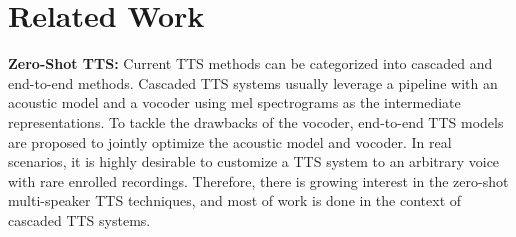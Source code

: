 \documentclass{article}
\theoremstyle{plain}
\theoremstyle{definition}
\theoremstyle{remark}
\newcommand\our{\textsc{VALL-E}}
\begin{document}

\section{Related Work}
\textbf{Zero-Shot TTS:} Current TTS methods can be categorized into cascaded  and end-to-end methods. Cascaded TTS systems \citep{DBLP:conf/icassp/ShenPWSJYCZWRSA18, DBLP:conf/nips/RenRTQZZL19,DBLP:conf/aaai/Li0LZL19} usually leverage a pipeline with an acoustic model and a vocoder using mel spectrograms as the intermediate representations. To tackle the drawbacks of the vocoder, end-to-end TTS models \citep{DBLP:conf/icml/KimKS21, DBLP:conf/interspeech/LiuXH0Z22} are proposed to jointly optimize the acoustic model and vocoder. 
  In real scenarios, it is highly desirable to customize a TTS system to an arbitrary voice with rare enrolled recordings.
Therefore, there is growing interest in the zero-shot multi-speaker TTS techniques, and most of work is done in the context of cascaded TTS systems. 
\end{document}
